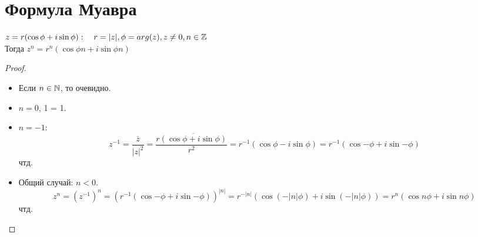 \section{Формула Муавра}

\begin{theorem}{}
$z = r(\cos \phi + i \sin \phi):\quad r = |z|, \phi = arg(z), z \ne 0, n \in \mathbb{Z}$ \\
\hspace*{1cm}Тогда $z^n = r^n(\cos{\phi n} + i \sin{ \phi n})$
\end{theorem} 
\begin{proof}
\begin{itemize}
\item Если $n \in \mathbb{N}$, то очевидно.
\item $n = 0$, 1 = 1.
\item $n = -1:$ 
$$z^{-1} = \frac{\overline{z}}{|z|^2} = \frac{r\overline{(\cos \phi + i \sin \phi)}}{r^2} = r^{-1}(\cos \phi - i \sin \phi) = r^{-1}(\cos{-\phi} + i \sin{-\phi})$$ 
чтд.
\item Общий случай: $n < 0$.
$$z^n = (z^{-1})^n = (r^{-1}(\cos{-\phi} + i \sin{-\phi}))^{|n|} = r^{-|n|}( \cos(-|n| \phi) + i \sin(-|n| \phi)) = r^n(\cos{n \phi} + i \sin{n \phi})$$
чтд.
\end{itemize}
\end{proof}


